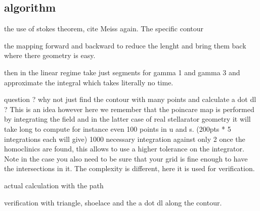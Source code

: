 \subsection{algorithm}

the use of stokes theorem, cite Meiss again.
The specific contour

the mapping forward and backward to reduce the lenght and bring them back where there geometry is easy.

then in the linear regime take just segments for gamma 1 and gamma 3 and approximate the integral which takes literally no time.

question ? why not just find the contour with many points and calculate a dot dl ? This is an idea however here we remember that the poincare map is performed by integrating the field and in the latter case of real stellarator geometry it will take long to compute for instance even 100 points in u and s. (200pts * 5 integrations each will give) 1000 necessary integration against only 2 once the homoclinics are found, this allows to use a higher tolerance on the integrator. Note in the case you also need to be sure that your grid is fine enough to have the intersections in it. The complexity is different, here it is used for verification.

actual calculation with the path 

verification with triangle, shoelace and the a dot dl along the contour.